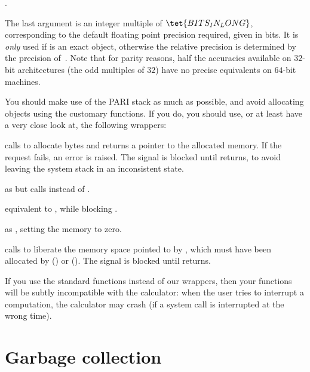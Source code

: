 .

\noindent The last argument  is an integer multiple of $\tet{BITS_IN_LONG}$,
corresponding to the default floating point precision required, given in bits.
It is \emph{only} used if
 is an exact object, otherwise the relative precision is determined by
the precision of~. Note that for parity reasons, half the accuracies
available on $32$-bit architectures (the odd multiples of $32$) have no precise
equivalents on $64$-bit machines.

You should make use of the PARI stack as much as possible, and avoid
allocating objects using the customary functions. If you do, you should
use, or at least have a very close look at, the following wrappers:

 calls  to allocate
 bytes and returns a pointer to the allocated memory. If the
request fails, an error is raised. The  signal is blocked until
 returns, to avoid leaving the system stack in an inconsistent
state.

 as  but
calls  instead of .

equivalent to , while blocking .

 as , setting the
memory to zero.

 calls  to liberate the memory
space pointed to by , which must have been allocated by 
() or  (). The 
signal is blocked until  returns.

If you use the standard  functions instead of our wrappers, then
your functions will be subtly incompatible with the  calculator: when
the user tries to interrupt a computation, the calculator may crash
(if a system call is interrupted at the wrong time).

\section{Garbage collection}\label{se:garbage}


